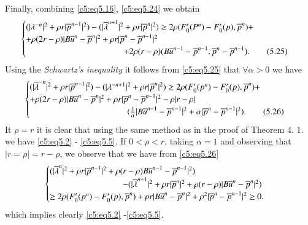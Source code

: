 Finally,  combining \eqref{c5:eq5.16}, \eqref{c5:eq5.24} we obtain 
\begin{equation}
\begin{cases}
(| \lambda^{-n} |^2 + \rho r |\ob{p}^{n-1}|^2 ) - (|\ob{\lambda}^{n+1}|^2 +
  \rho r | \ob{p}^{n} |^2)  
\geq 2 \rho (F'_0 (P^n) - F'_0 (p), \ob{p}^{n})+ \\
+ \rho (2r - \rho) | B\ob{u}^{n} - \ob{p}^{n} |^2 + \rho r |
\ob{p}^{n} - \ob{p}^{n-1}|^2\\  
\hspace{4cm}+ 2 
\rho (r - \rho) (B\ob{u}^{n-1} - \ob{p}^{n-1},  \ob{p}^{n} - \ob{p}^{n
  - 1}). \tag{5.25}\label{c5:eq5.25} 
\end{cases}
\end{equation}\pageoriginale  
Using the \textit{Schwartz's inequality} it follows from \eqref{c5:eq5.25} that $\forall \alpha > 0$ we have 
{\fontsize{10}{12}\selectfont
\begin{equation}
\begin{cases}
(| \ob{\lambda}^{-n} |^2 + \rho r |\ob{p}^{n-1}|^2 ) - ( |\lambda^{- n
    + 1}|^2 + \rho r  
| \ob{p}^{n} |^2 ) \geq 2 \rho (F'_0 (p^n) - F'_0 (p),  \ob{p}^{n}) +\\
+ \rho (2r - \rho) | B\ob{u}^{n} -\ob{p}^{n}|^2 + \rho r | \ob{p}^{n} -
\ob{p}^{n - 1} |^2 -\rho  
| r - \rho |\\
\hspace{4cm}( \frac{1}{\alpha}| B\ob{u}^{n-1} - \ob{p}^{n - 1}|^2 +
\alpha | \ob{p}^{n}  -\ob{p}^{n -1}|^2). 
\tag{5.26}\label{c5:eq5.26}
\end{cases}
\end{equation}}\relax
It $\rho = r$ it is clear that using the same method as in the proof of 
Theorem 4. 1.  we have \eqref{c5:eq5.2} - \eqref{c5:eq5.5}.  If $0 < 
\rho < r$,  taking $\alpha =1$ and observing that $| r = \rho | = 
r-\rho$,  we observe that we have from \eqref{c5:eq5.26}
\begin{equation*}
\begin{cases}
(|\ob{\lambda}^{n} |^2 + \rho r | \ob{p}^{n - 1}|^2 + \rho (r - \rho)
  B\ob{u}^{n-1}  - \ob{p}^{n - 1}|^2 )\\ 
  \hspace{3cm}- (|\ob{\lambda}^{n+1}|^2 +
  \rho r | \ob{p}^{n}|^2 + \rho (r - \rho) | B \ob{u}^{n} -
  \ob{p}^{n}|^2)\\ 
  \geq 2 \rho (F'_0(p^n) - F'_0 (p),  \ob{p}^{n} ) + \rho r |
  B\ob{u}^{n} - \ob{p}^{n} |^2 + \rho^2| \ob{p}^{n} - \ob{p}^{n-1}|^2 \geq 0.  
\end{cases}
\end{equation*}
which implies clearly \eqref{c5:eq5.2} -\eqref{c5:eq5.5}.  

